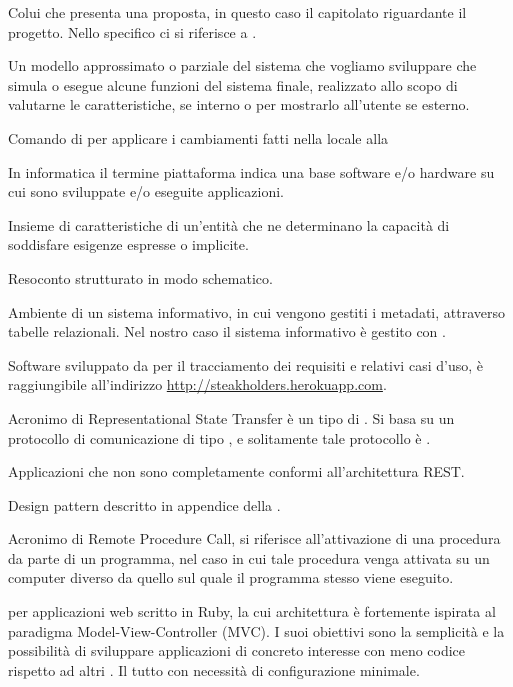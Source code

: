 Colui che presenta una proposta, in questo caso il capitolato riguardante il progetto.
Nello specifico ci si riferisce a \Proponente{}.

Un modello approssimato o parziale del sistema che vogliamo sviluppare che simula o esegue alcune funzioni del sistema finale, realizzato allo scopo di valutarne le caratteristiche, se interno o per mostrarlo all'utente se esterno.

Comando di  per applicare i cambiamenti fatti nella  locale alla 

In informatica il termine piattaforma indica una base software e/o hardware su cui sono sviluppate e/o eseguite applicazioni.


Insieme di caratteristiche di un'entità che ne determinano la capacità di soddisfare esigenze espresse o implicite.


Resoconto strutturato in modo schematico.

Ambiente di un sistema informativo, in cui vengono gestiti i metadati, attraverso tabelle relazionali.
Nel nostro caso il sistema informativo è gestito con .

Software sviluppato da \GroupName{} per il tracciamento dei requisiti e relativi casi d'uso, è raggiungibile all'indirizzo \url{http://steakholders.herokuapp.com}.

Acronimo di Representational State Transfer è un tipo di . Si basa su un protocollo di comunicazione  di tipo , e solitamente tale protocollo è .

Applicazioni che non sono completamente conformi all'architettura REST.

Design pattern descritto in appendice della \SpecificaTecnica{}.

Acronimo di Remote Procedure Call, si riferisce all'attivazione di una procedura da parte di un programma, nel caso in cui tale procedura venga attivata su un computer diverso da quello sul quale il programma stesso viene eseguito.

  per applicazioni web scritto in Ruby, la cui architettura è fortemente ispirata al paradigma Model-View-Controller (MVC). I suoi obiettivi sono la semplicità e la possibilità di sviluppare applicazioni di concreto interesse con meno codice rispetto ad altri . Il tutto con necessità di configurazione minimale.

